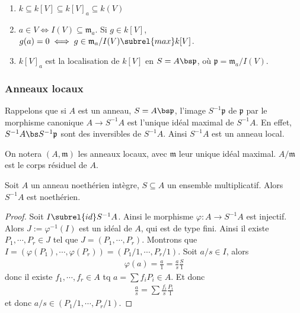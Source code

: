             \begin{remq}
                \begin{enumerate}
                \item $k \subseteq k[V] \subseteq k[V]_a \subseteq k(V)$
                \item $a \in V \iff I(V) \subseteq \mathfrak{m}_a$. Si $g \in k[V]$, $g(a) = 0 \iff g \in \mathfrak{m}_a/I(V) \subrel{max} k[V]$.
                \item $k[V]_a$ est la localisation de $k[V]$ en $S = A \bs \mathfrak{p}$, où $\mathfrak{p} = \mathfrak{m}_a/I(V)$. 
                \end{enumerate}
            \end{remq}

            \subsubsection{Anneaux locaux}
                Rappelons que si $A$ est un anneau, $S = A \bs \mathfrak{p}$, l'image $S^{-1} \mathfrak{p}$ de $\mathfrak{p}$ par le morphisme canonique $A \to S^{-1}A$ est l'unique idéal maximal de $S^{-1}A$. En effet, $S^{-1} A \bs S^{-1}\mathfrak{p}$ sont des inversibles de $S^{-1}A$. Ainsi $S^{-1}A$ est un anneau local. 
                \begin{nota}
                    On notera $(A, \mathfrak{m})$ les anneaux locaux, avec $\mathfrak{m}$ leur unique idéal maximal. $A/\mathfrak{m}$ est le corps résiduel de $A$.
                \end{nota}
                \begin{prop}
                    Soit $A$ un anneau noethérien intègre, $S \subseteq A$ un ensemble multiplicatif. Alors $S^{-1}A$ est noethérien.
                \end{prop}
                \begin{proof}
                    Soit $I \subrel{id} S^{-1}A$. Ainsi le morphisme $\varphi : A \to S^{-1}A$ est injectif. Alors $J := \varphi^{-1}(I)$ est un idéal de $A$, qui est de type fini. Ainsi il existe $P_1, \cdots, P_r \in J$ tel que $J = (P_1, \cdots, P_r)$. Montrons que $I = (\varphi(P_1), \cdots, \varphi(P_r)) = (P_1/1, \cdots, P_r/1)$. Soit $a/s \in I$, alors 
                    \begin{align*}
                        \varphi(a) = \frac a1 = \frac as \frac S1
                    \end{align*}
                    donc il existe $f_1, \cdots, f_r \in A$ tq $a = \sum f_i P_i \in A$. Et donc
                    \begin{align*}
                        \frac as = \sum \frac{f_i}s \frac{P_i}1
                    \end{align*}
                    et donc $a/s \in (P_1/1, \cdots, P_r/1)$.
                \end{proof}
